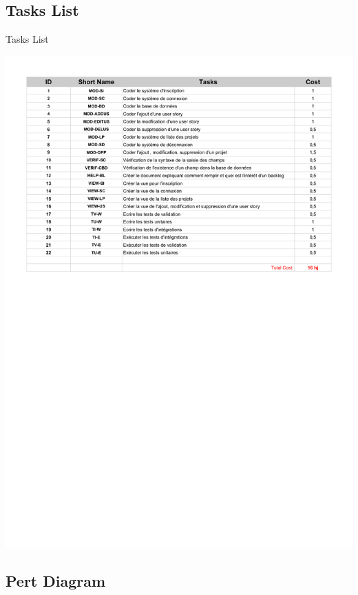 \documentclass{beamer}
\begin{document}
\subsection{Tasks List}

\begin{frame}{Tasks List}
	\begin{center}
        \includegraphics[scale=0.5]{TasksList.pdf}
        \end{center}
\end{frame}

\subsection{Pert Diagram}
\end{document}
